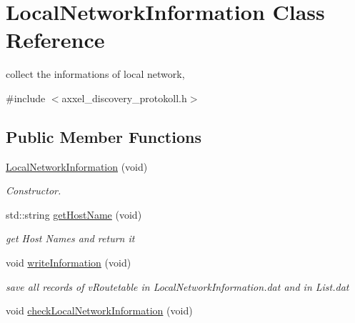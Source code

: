 \hypertarget{classLocalNetworkInformation}{\section{Local\-Network\-Information Class Reference}
\label{classLocalNetworkInformation}
}


collect the informations of local network,  




{\ttfamily \#include $<$axxel\-\_\-discovery\-\_\-protokoll.\-h$>$}

\subsection*{Public Member Functions}
\begin{DoxyCompactItemize}
\item 
\hyperlink{classLocalNetworkInformation_abfc5f9ac0fdadb62ee1e2ab185a41e55}{Local\-Network\-Information} (void)
\begin{DoxyCompactList}\small\item\em Constructor. \end{DoxyCompactList}\item 
std\-::string \hyperlink{classLocalNetworkInformation_a63cf18e0d7cdc14426e4999ef397c981}{get\-Host\-Name} (void)
\begin{DoxyCompactList}\small\item\em get Host Names and return it \end{DoxyCompactList}\item 
\hypertarget{classLocalNetworkInformation_a5f0ad08e02985e56e8693398de34a709}{void \hyperlink{classLocalNetworkInformation_a5f0ad08e02985e56e8693398de34a709}{write\-Information} (void)}\label{classLocalNetworkInformation_a5f0ad08e02985e56e8693398de34a709}

\begin{DoxyCompactList}\small\item\em save all records of v\-Routetable in Local\-Network\-Information.\-dat and in List.\-dat \end{DoxyCompactList}\item 
\hypertarget{classLocalNetworkInformation_ae9406771f43259c0922ab445baf2ea3e}{void \hyperlink{classLocalNetworkInformation_ae9406771f43259c0922ab445baf2ea3e}{check\-Local\-Network\-Information} (void)}\label{classLocalNetworkInformation_ae9406771f43259c0922ab445baf2ea3e}


\end{DoxyCompactItemize}
